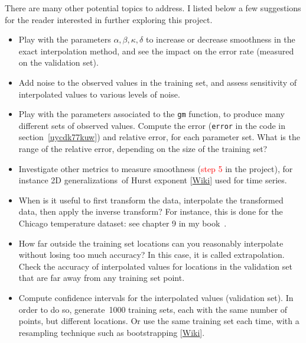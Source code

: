 \documentclass[oneside,10pt]{book}
\begin{document}
There are many other potential topics to address. I listed below a few suggestions for the reader interested in further exploring
this project. \vspace{1ex}

\begin{itemize}
\item Play with the parameters $\alpha, \beta, \kappa, \delta$ to increase or decrease smoothness in the exact interpolation method, and see the impact on the error rate (measured on the validation set).
\item Add noise to the observed values in the training set, and assess sensitivity of interpolated values to various levels of noise.
\item Play with the parameters associated to the \texttt{gm} function, to produce many different sets of observed values. Compute the error (\texttt{error} in the code in section~\ref{uycdk77kuw}) and relative error, for each parameter set. What is the range 
 of the relative error, depending on the size of the training set?
\item Investigate other metrics to measure smoothness (\textcolor{red}{step 5} in the project),  for instance 2D generalizations~of 
 \textcolor{index}{Hurst exponent} [\href{https://en.wikipedia.org/wiki/Hurst_exponent}{Wiki}] used for time series. 
\item When is it useful to first transform the data, interpolate the transformed data, then apply the inverse transform? For instance, this is done for the Chicago temperature dataset: see chapter 9 in my book~\cite{vgelsevier}. 
\item How far outside the training set locations can you reasonably interpolate without losing too much accuracy? In this case, it is called extrapolation. Check the accuracy of interpolated values for locations in the validation set that are far away from any training set point.
\item Compute confidence intervals for the interpolated values (validation set). In order to do so, generate~1000 training sets, each with the same number of points, but different locations. Or use the same training set each time, with a \textcolor{index}{resampling} technique 
 such as \textcolor{index}{bootstrapping} [\href{https://en.wikipedia.org/wiki/Bootstrapping_(statistics)}{Wiki}].
\end{itemize}\vspace{1ex}
\end{document}
